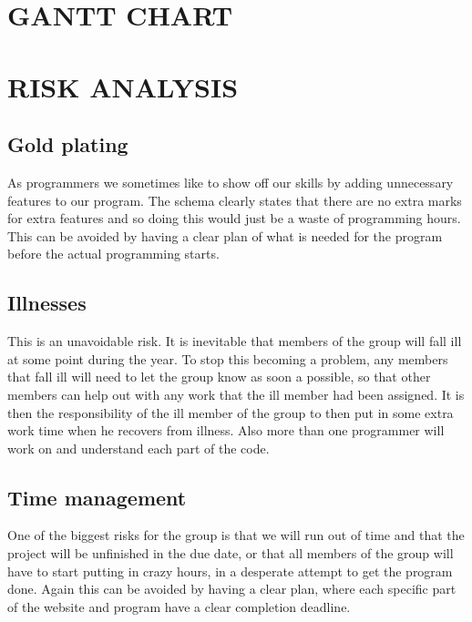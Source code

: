 \documentclass{project}
\begin{document}
\section{GANTT CHART}

\begin{figure}[H]
\end{figure}

\clearpage

\section{RISK ANALYSIS}
\subsection{Gold plating}
As programmers we sometimes like to show off our skills by adding unnecessary features to our program.
The schema clearly states that there are no extra marks for extra features and so doing this would just
be a waste of programming hours. This can be avoided by having a clear plan of what is needed for the
program before the actual programming starts.

\subsection{Illnesses}
This is an unavoidable risk. It is inevitable that members of the group will fall ill at some point during the year. 
To stop this becoming a problem, any members that fall ill will need to let the group know as soon a possible, so that 
other members can help out with any work that the ill member had been assigned. It is then the responsibility of the 
ill member of the group to then put in some extra work time when he recovers from illness. Also more than one programmer will work on and understand each part of the code.

\subsection{Time management}
One of the biggest risks for the group is that we will run out of time and that the project will be unfinished in the due date,
or that all members of the group will have to start putting in crazy hours, in a desperate attempt to get the program done.
Again this can be avoided by having a clear plan, where each specific part of the website and program have a clear completion deadline.
 
\end{document}
